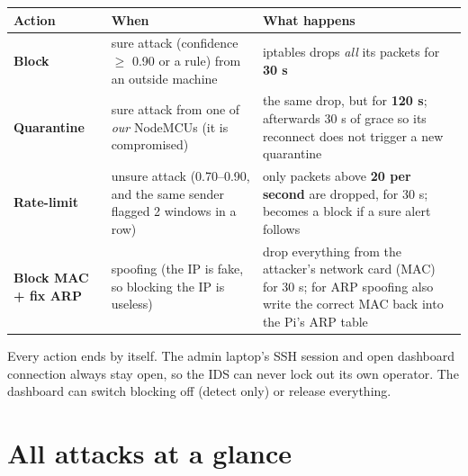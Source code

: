\documentclass[11pt,a4paper]{article}
\begin{document}
\begin{center}
\begin{tabularx}{\linewidth}{P{3.8cm}P{4.6cm}L}
\toprule
Action & When & What happens \\
\midrule
\textbf{Block} & sure attack (confidence $\geq$ 0.90 or a rule) from an outside machine & iptables drops
\emph{all} its packets for \textbf{30 s} \\
\textbf{Quarantine} & sure attack from one of \emph{our} NodeMCUs (it is compromised) & the same drop, but for
\textbf{120 s}; afterwards 30 s of grace so its reconnect does not trigger a new quarantine \\
\textbf{Rate-limit} & unsure attack (0.70--0.90, and the same sender flagged 2 windows in a row) & only packets above
\textbf{20 per second} are dropped, for 30 s; becomes a block if a sure alert follows \\
\textbf{Block MAC + fix ARP} & spoofing (the IP is fake, so blocking the IP is useless) & drop everything from the
attacker's network card (MAC) for 30 s; for ARP spoofing also write the correct MAC back into the Pi's ARP table \\
\bottomrule
\end{tabularx}
\end{center}

Every action ends by itself. The admin laptop's SSH session and open dashboard connection always stay open, so the
IDS can never lock out its own operator. The dashboard can switch blocking off (detect only) or release everything.

\section{All attacks at a glance}
\end{document}
